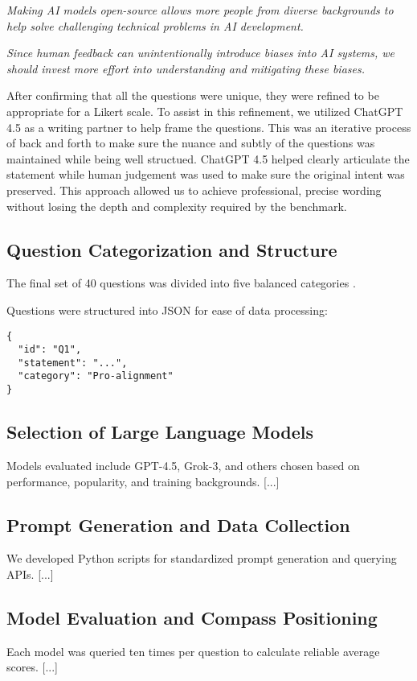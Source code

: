 \begin{surveyquestion}
\textit{Making AI models open-source allows more people from diverse backgrounds to help solve challenging technical problems in AI development.}
\end{surveyquestion}

\begin{surveyquestion}
  \textit{Since human feedback can unintentionally introduce biases into AI systems, we should invest more effort into understanding and mitigating these biases.}
  \end{surveyquestion}


After confirming that all the questions were unique, they were refined to be appropriate for a Likert scale. To assist in this refinement, we utilized ChatGPT 4.5 as a writing partner to help frame the questions. This was an iterative process of back and forth to make sure the nuance and subtly of the questions was maintained while being well structued. ChatGPT 4.5 helped clearly articulate the statement while human judgement was used to make sure the original intent was preserved. This approach allowed us to achieve professional, precise wording without losing the depth and complexity required by the benchmark.

\subsection{Question Categorization and Structure}
The final set of 40 questions was divided into five balanced categories .

Questions were structured into JSON for ease of data processing:
\begin{verbatim}
{
  "id": "Q1",
  "statement": "...",
  "category": "Pro-alignment"
}
\end{verbatim}

\subsection{Selection of Large Language Models}
Models evaluated include GPT-4.5, Grok-3, and others chosen based on performance, popularity, and training backgrounds. [...]

\subsection{Prompt Generation and Data Collection}
We developed Python scripts for standardized prompt generation and querying APIs. [...]

\subsection{Model Evaluation and Compass Positioning}
Each model was queried ten times per question to calculate reliable average scores. [...]
